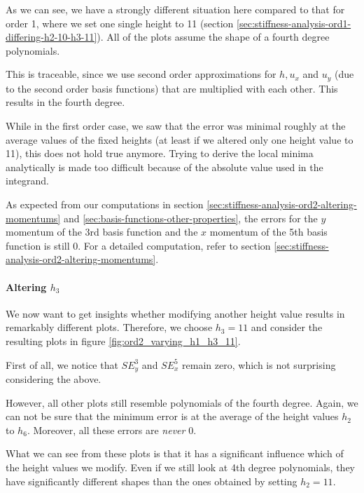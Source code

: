 \documentclass{article}
\begin{document}
As we can see, we have a strongly different situation here compared to that for order 1, where we set one single height to 11 (section \ref{sec:stiffness-analysis-ord1-differing-h2-10-h3-11}). All of the plots assume the shape of a fourth degree polynomials.

This is traceable, since we use second order approximations for $h, u_x$ and $u_y$ (due to the second order basis functions) that are multiplied with each other. This results in the fourth degree.

While in the first order case, we saw that the error was minimal roughly at the average values of the fixed heights (at least if we altered only one height value to 11), this does not hold true anymore. Trying to derive the local minima analytically is made too difficult because of the absolute value used in the integrand.

As expected from our computations in section \ref{sec:stiffness-analysis-ord2-altering-momentums} and \ref{sec:basis-functions-other-properties}, the errors for the $y$ momentum of the 3rd basis function and the $x$ momentum of the 5th basis function is still 0. For a detailed computation, refer to section \ref{sec:stiffness-analysis-ord2-altering-momentums}.

\paragraph{\texorpdfstring{Altering $h_3$}{Altering h3}}

We now want to get insights whether modifying another height value results in remarkably different plots. Therefore, we choose $h_3=11$ and consider the resulting plots in figure \ref{fig:ord2_varying_h1_h3_11}.



First of all, we notice that $SE_y^3$ and $SE_x^5$ remain zero, which is not surprising considering the above.

However, all other plots still resemble polynomials of the fourth degree. Again, we can not be sure that the minimum error is at the average of the height values $h_2$ to $h_6$. Moreover, all these errors are \emph{never} 0.

What we can see from these plots is that it has a significant influence which of the height values we modify. Even if we still look at 4th degree polynomials, they have significantly different shapes than the ones obtained by setting $h_2=11$.
\end{document}
